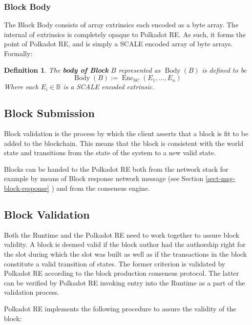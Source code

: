 \documentclass{book}
\newcommand{\assign}{:=}
\newcommand{\tmop}[1]{\ensuremath{\operatorname{#1}}}
\newcommand{\tmstrong}[1]{\textbf{#1}}
\newcommand{\tmtextbf}[1]{{\bfseries{#1}}}
\newcommand{\tmtexttt}[1]{{\ttfamily{#1}}}
\newcommand{\tmverbatim}[1]{{\ttfamily{#1}}}
\newtheorem{definition}{Definition}
\providecommand{\tmop}[1]{\ensuremath{\mathrm{#1}}}
\providecommand{\tmstrong}[1]{\tmtextbf{#1}}
\providecommand{\tmtextbf}[1]{\tmtextbf{#1}}
\providecommand{\tmverbatim}[1]{\tmtexttt{#1}}
\newtheorem{definition}{Definition}
\begin{document}
\subsubsection{Block Body}\label{sect-block-body}

The Block Body consists of array extrinsics each encoded as a byte array. The
internal of extrinsics is completely opaque to Polkadot RE. As such, it forms
the point of Polkadot RE, and is simply a SCALE encoded array of byte arrays.
Formally:

\begin{definition}
  \label{defn-block-body}The {\tmstrong{body of Block}} $B$ represented as
  {\tmstrong{$\tmop{Body} (B)$}} is defined to be
  \[ \tmop{Body} (B) \assign \tmop{Enc}_{\tmop{SC}} (E_1, \ldots, E_n) \]
  Where each $E_i \in \mathbb{B}$ is a SCALE encoded extrinsic.
\end{definition}

\subsection{Block Submission}\label{sect-block-submission}

Block validation is the process by which the client asserts that a block is
fit to be added to the blockchain. This means that the block is consistent
with the world state and transitions from the state of the system to a new
valid state.

Blocks can be handed to the Polkadot RE both from the network stack for
example by means of Block response network message (see Section
\ref{sect-msg-block-response} ) and from the consensus engine.

\subsection{Block Validation}\label{sect-block-validation}

Both the Runtime and the Polkadot RE need to work together to assure block
validity. A block is deemed valid if the block author had the authorship right
for the slot during which the slot was built as well as if the transactions in
the block constitute a valid transition of states. The former criterion is
validated by Polkadot RE according to the block production consensus protocol.
The latter can be verified by Polkadot RE invoking \tmverbatim{execute\_block}
entry into the Runtime as a part of the validation process.

Polkadot RE implements the following procedure to assure the validity of the
block:
\end{document}
